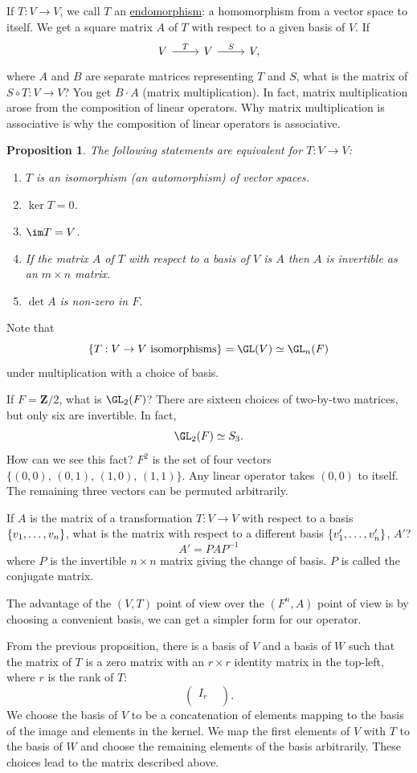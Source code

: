 \documentclass[11pt, oneside]{amsart}
\numberwithin{equation}{section}
\numberwithin{theorem}{section}
\newtheorem{proposition}[theorem]{Proposition}
\theoremstyle{definition}
\let\bf\relax
\def\Z{\mathbf{Z}}
\begin{document}
If $T: V\to V$, we call $T$ an \underline{endomorphism}: a homomorphism from a vector space to itself. We get a square matrix $A$ of $T$ with respect to a given basis of $V$. If 
$$
\begin{tikzcd}
V\arrow{r}{T} & V\arrow{r}{S} & V,
\end{tikzcd}
$$
where $A$ and $B$ are separate matrices representing $T$ and $S$, what is the matrix of $S\circ T : V\to V$? You get $B\cdot A$ (matrix multiplication). In fact, matrix multiplication arose from the composition of linear operators. Why matrix multiplication is associative is why the composition of linear operators is associative.

\begin{proposition}
The following statements are equivalent for $T: V\to V$:
\begin{enumerate}[label=(\roman*)]
\item $T$ is an isomorphism (an automorphism) of vector spaces.
\item $\ker T = 0$.
\item $\im T = V$.
\item If the matrix $A$ of $T$ with respect to a basis of $V$ is $A$ then $A$ is invertible as an $m\times n$ matrix.
\item $\det A$ is non-zero in $F$.
\end{enumerate} 
\end{proposition}
Note that 
$$
\{T: V\to V \textrm{ isomorphisms}\} = \GL(V) \simeq \GL_n(F)
$$
under multiplication with a choice of basis. 

If $F = \Z/2$, what is $\GL_2(F)$? There are sixteen choices of two-by-two matrices, but only six are invertible. In fact, 
$$
\GL_2(F) \simeq S_3.
$$
How can we see this fact? $F^2$ is the set of four vectors $\{(0,0),\, (0,1),\, (1,0),\, (1,1)\}$. Any linear operator takes $(0,0)$ to itself. The remaining three vectors can be permuted arbitrarily. 

If $A$ is the matrix of a transformation $T:V\to V$ with respect to a basis $\{\bf v_1,\hdots, \bf v_n\}$, what is the matrix with respect to a different basis $\{\bf v'_1,\hdots, \bf v'_n\}$, $A'$?
$$
A' = PAP^{-1} 
$$
where $P$ is the invertible $n\times n $ matrix giving the change of basis. $P$ is called the conjugate matrix. 

The advantage of the $(V, T)$ point of view over the $(F^n, A)$ point of view is by choosing a convenient basis, we can get a simpler form for our operator.

From the previous proposition, there is a basis of $V$ and a basis of $W$ such that the matrix of $T$ is a zero matrix with an $r\times r$ identity matrix in the top-left, where $r$ is the rank of $T$:
$$
\begin{pmatrix} I_r & \\  & \end{pmatrix}.
$$
We choose the basis of $V$ to be a concatenation of elements mapping to the basis of the image and elements in the kernel. We map the first elements of $V$ with $T$ to the basis of $W$ and choose the remaining elements of the basis arbitrarily. These choices lead to the matrix described above. 
\end{document}
